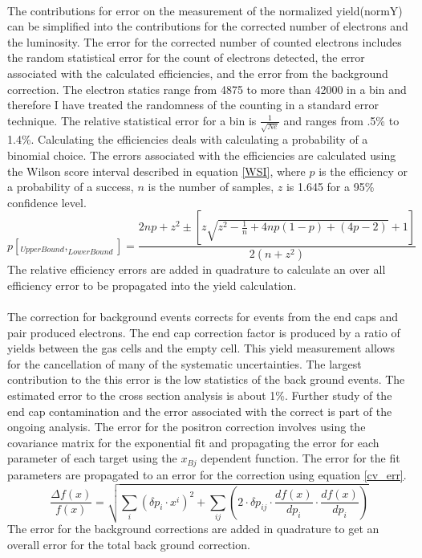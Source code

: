 \paragraph{}
The contributions for error on the measurement of the normalized yield(normY) can be simplified into the contributions for the corrected number of electrons and the luminosity. The error for the corrected number of counted electrons includes the random statistical error for the count of electrons detected, the error associated with the calculated efficiencies, and the error from the background correction. The electron statics range from 4875 to more than 42000 in a bin and therefore I have treated the randomness of the counting in a standard error technique. The relative statistical error for a bin is $\frac{1}{\sqrt{Ne}}$ and ranges from .5\% to 1.4\%. Calculating the efficiencies deals with calculating a probability of a binomial choice. The errors associated with the efficiencies are calculated using the Wilson score interval described in equation \ref{WSI}, where $p$ is the efficiency or a probability of a success, $n$ is the number of samples, $z$ is 1.645 for a 95\% confidence level. 
\begin{equation}
p[_{UpperBound},_{LowerBound}] = \frac{ 2np +z^2 \pm \left[z\sqrt{z^2 - \frac{1}{n} + 4np(1-p) +(4p-2)} + 1 \right]}{2(n+z^2)} \label{WSI}
\end{equation}
The relative efficiency errors are added in quadrature to calculate an over all efficiency error to be propagated into the yield calculation.
\paragraph{}The correction for background events corrects for events from the end caps and pair produced electrons. The end cap correction factor is produced by a ratio of yields between the gas cells and the empty cell. This yield measurement allows for the cancellation of many of the systematic uncertainties. The largest contribution to the this error is the low statistics of the back ground events. The estimated error to the cross section analysis is about 1\%. Further study of the end cap contamination and the error associated with the correct is part of the ongoing analysis. The error for the positron correction involves using the covariance matrix for the exponential fit and propagating the error for each parameter of each target using the $x_{Bj}$ dependent function. The error for the fit parameters are propagated to an error for the correction using equation \ref{cv_err}.
\begin{equation}
\frac{\Delta f(x)}{f(x)} =  \sqrt{ \sum_{i}^{} \left(\delta p_i\cdot x^i\right)^2 + \sum_{ij}^{}\left( 2\cdot \delta p_{ij}\cdot \dfrac{df(x)}{dp_i}\cdot \dfrac{df(x)}{dp_i}\right) } \label{cv_err}
\end{equation}
The error for the background corrections are added in quadrature to get an overall error for the total back ground correction.  
